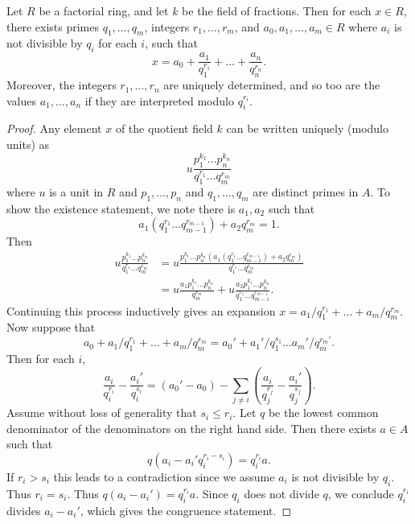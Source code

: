\begin{lemma}
    Let $R$ be a factorial ring, and let $k$ be the field of fractions. Then for each $x \in R$, there exists primes $q_1,\dots,q_m$, integers $r_1,\dots,r_m$, and $a_0,a_1,\dots,a_m \in R$ where $a_i$ is not divisible by $q_i$ for each $i$, such that
    \[ x = a_0 + \frac{a_1}{q_1^{r_1}} + \dots + \frac{a_n}{q_n^{r_n}}. \]
    Moreover, the integers $r_1,\dots,r_n$ are uniquely determined, and so too are the values $a_1,\dots,a_n$ if they are interpreted modulo $q_i^{r_i}$.
\end{lemma}
\begin{proof}
    Any element $x$ of the quotient field $k$ can be written uniquely (modulo units) as
    \[ u \frac{p_1^{k_1} \dots p_n^{k_n}}{q_1^{r_1} \dots q_m^{r_m}} \]
    where $u$ is a unit in $R$ and $p_1,\dots,p_n$ and $q_1,\dots,q_m$ are distinct primes in $A$. To show the existence statement, we note there is $a_1,a_2$ such that
    \[ a_1(q_1^{r_1} \dots q_{m-1}^{r_{m-1}}) + a_2q_m^{r_m} = 1. \]
    Then
    \begin{align*}
        u \frac{p_1^{k_1} \dots p_n^{k_n}}{q_1^{r_1} \dots q_m^{r_m}} &= u \frac{p_1^{k_1} \dots p_n^{k_n}(a_1(q_1^{r_1} \dots q_{m-1}^{r_{m-1}}) + a_2q_m^{r_m})}{q_1^{r_1} \dots q_m^{r_m}}\\
        &= u \frac{a_1 p_1^{k_1} \dots p_n^{k_n}}{q_m^{r_m}} + u \frac{a_2 p_1^{k_1} \dots p_n^{k_n}}{q_1^{r_1} \dots q_{m-1}^{r_{m-1}}}.
    \end{align*}
    Continuing this process inductively gives an expansion $x = a_1/q_1^{r_1} + \dots + a_m/q_m^{r_m}$. Now suppose that
    \[ a_0 + a_1/q_1^{r_1} + \dots + a_m/q_m^{r_m} = a_0' + a_1'/q_1^{s_1} \dots a_m'/q_m^{r_m'}. \]
    Then for each $i$,
    \[ \frac{a_i}{q_i^{r_i}} - \frac{a_i'}{q_i^{s_i}} = (a_0' - a_0) - \sum_{j \neq i} \left( \frac{a_i}{q_j^{r_j}} - \frac{a_i'}{q_j^{s_j}} \right). \]
    Assume without loss of generality that $s_i \leq r_i$. Let $q$ be the lowest common denominator of the denominators on the right hand side. Then there exists $a \in A$ such that
    \[ q(a_i - a_i' q_i^{r_i - s_i})  = q_i^{r_i} a. \]
    If $r_i > s_i$ this leads to a contradiction since we assume $a_i$ is not divisible by $q_i$. Thus $r_i = s_i$. Thus $q(a_i - a_i') = q_i^{r_i} a$. Since $q_i$ does not divide $q$, we conclude $q_i^{r_i}$ divides $a_i - a_i'$, which gives the congruence statement.
\end{proof}

